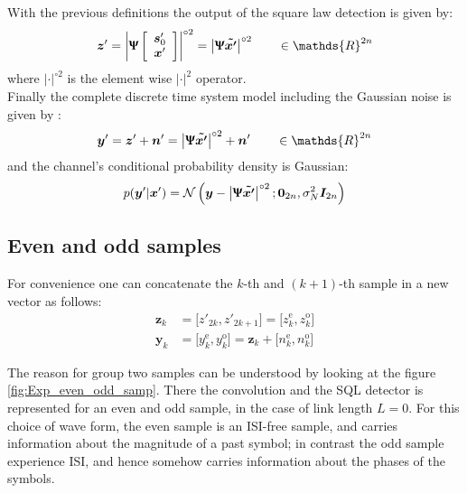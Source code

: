 With the previous definitions the output of the square law detection is given by:
\begin{align*}
	\bm z' = \left|\bm \Uppsi \left[
\begin{array}{c}
\bm{s}'_0  \\
   \bm x'
\end{array}
\right]
\right|^{\circ2} = \left|\bm{ \Uppsi \tilde{x'}}\right|^{\circ2} \qquad \in\mathds{R}^{2n}
\end{align*}
where $|\cdot|^{\circ2}$ is the element wise $|\cdot|^2$ operator.\\

Finally  the complete discrete time system model including the Gaussian noise is given by \cite{Plabst_DD}:
\begin{align*}
	\bm y' = \bm z' + \bm n' = \left|\bm{ \Uppsi \tilde{x'}}\right|^{\circ2} +\bm n' \qquad \in \mathds{R}^{2n}
\end{align*}
and the channel’s conditional probability density is Gaussian\cite{Plabst_DD}:
\begin{equation}
p(\bm y'|\bm x')=\mathcal N \left( \bm y- \left|\bm{ \Uppsi \tilde{x'}}\right|^{\circ2}; \bm 0_{2n} , \sigma_N^2 \bm I_{2n}  \right)
\end{equation}

\subsection{Even and odd samples}

For convenience one can concatenate the $k$-th and $(k+1)$-th sample in a new vector as follows:
\begin{align}
\bm z_k&= \bigl[z'_{2k},z'_{2k+1}\bigr]=\bigl[z_{k}^{\text{e}},z_{k}^{\text{o}}\bigr]
\label{eq:z_even_odd}\\
\bm y_k&=\bigl[y_{k}^{\text{e}},y_{k}^{\text{o}}\bigr]=\bm z_k+\bigl[n_{k}^{\text{e}}, n_{k}^{\text{o}}\bigr]
\label{eq:y_even_odd}
\end{align}

The reason for group two samples can be understood by looking at the figure \ref{fig:Exp_even_odd_samp}. There the convolution and the SQL detector is represented for an even and odd sample, in the case of link length $L=0$. For this choice of wave form, the even sample is an ISI-free sample, and carries information about the magnitude of a past symbol; in contrast the odd sample experience ISI, and hence somehow carries information about the phases of the symbols.  



